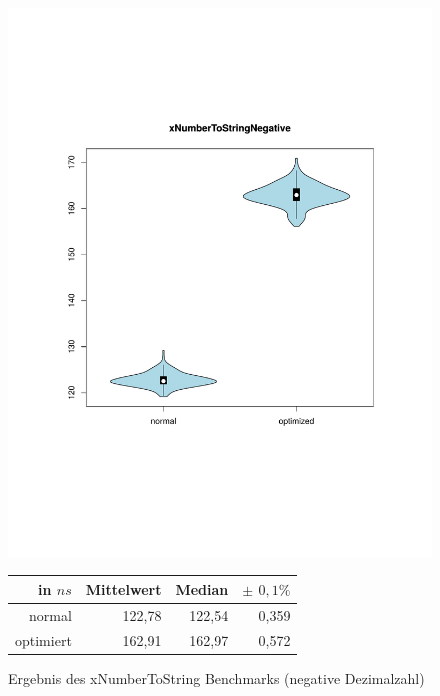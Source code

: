 \begin{figure}[H]
{		\includegraphics[trim=20mm 60mm 0mm 50mm,scale=0.50]{pictures/vioplot_xNumberToStringNegative.pdf}
	}
	\begin{table}[H]
	\centering
		\begin{tabular}{|r|r|r|r|}
			\hline
		   	in $ns$   & Mittelwert & Median & \bf{$\pm$ $0,1\%$} \\
		 	\hline
		 	\hline
		  	normal 	  & 122,78 & 122,54 & 0,359 \\
		 	optimiert & 162,91 & 162,97 & 0,572 \\ 
		  	\hline
		  	
		\end{tabular}
	\end{table}

	\caption{Ergebnis des xNumberToString Benchmarks (negative Dezimalzahl)}\label{bp:xNumNeg}
\end{figure}


